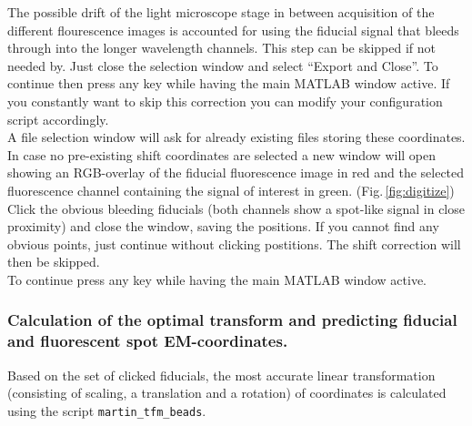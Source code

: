 \documentclass[10pt,a4paper,onepage,DIV12]{scrartcl}
\begin{document}
The possible drift of the light microscope stage in between acquisition of the different flourescence images is accounted for using the fiducial signal that bleeds through into the longer wavelength channels. This step can be skipped if not needed by. Just close the selection window and select ``Export and Close''. To continue then press any key while having the main MATLAB window active. If you constantly want to skip this correction you can modify your configuration script accordingly.\\

A file selection window will ask for already existing files storing these coordinates.\\

In case no pre-existing shift coordinates are selected a new window will open showing an RGB-overlay of the fiducial fluorescence image in red and the selected fluorescence channel containing the signal of interest in green. (Fig.\,\ref{fig:digitize})
Click the obvious bleeding fiducials (both channels show a spot-like signal in close proximity) and close the window, saving the positions.
% 
If you cannot find any obvious points, just continue without clicking postitions. The shift correction will then be skipped.\\

To continue press any key while having the main MATLAB window active.\\

\newpage
\subsubsection{Calculation of the optimal transform and predicting fiducial and fluorescent spot EM-coordinates.}
Based on the set of clicked fiducials, the most accurate linear transformation (consisting of scaling, a translation and a rotation) of coordinates is calculated using the script \texttt{martin\_tfm\_beads}.
% 

% 
\end{document}
